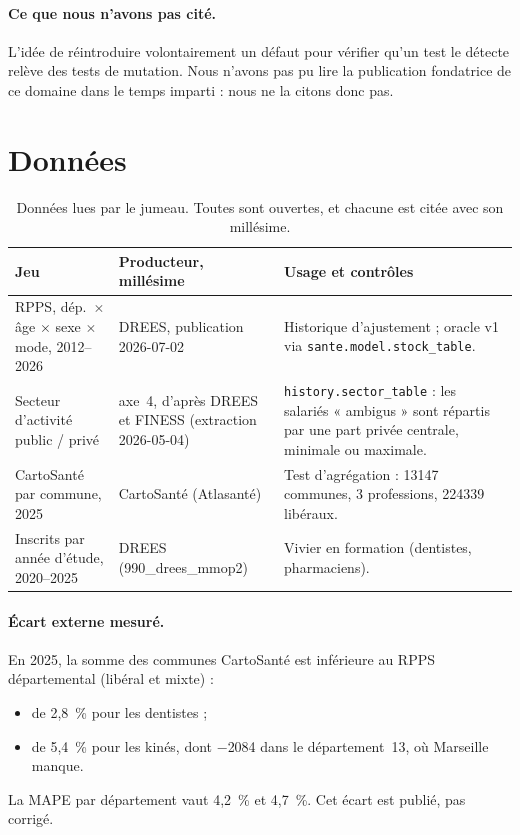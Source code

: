 \paragraph{Ce que nous n'avons pas cité.} L'idée de réintroduire volontairement un défaut pour
vérifier qu'un test le détecte relève des tests de mutation. Nous n'avons pas pu lire la publication
fondatrice de ce domaine dans le temps imparti : nous ne la citons donc pas.

\section{Données}

\begin{table}[h]
\centering\small
\begin{tabular}{p{4.2cm}p{3.3cm}p{6.4cm}}
\toprule
Jeu & Producteur, millésime & Usage et contrôles \\
\midrule
RPPS, dép.\ $\times$ âge $\times$ sexe $\times$ mode, 2012--2026 & DREES, publication 2026-07-02 &
Historique d'ajustement ; oracle v1 via \texttt{sante.model.stock\_table}. \\
Secteur d'activité public / privé & axe~4, d'après DREES et FINESS (extraction 2026-05-04) &
\texttt{history.sector\_table} : les salariés « ambigus » sont répartis par une part privée
centrale, minimale ou maximale. \\
CartoSanté par commune, 2025 & CartoSanté (Atlasanté) &
Test d'agrégation : \num{13147}\mesure{} communes, 3 professions, \num{224339}\mesure{} libéraux. \\
Inscrits par année d'étude, 2020--2025 & DREES (990\_drees\_mmop2) &
Vivier en formation (dentistes, pharmaciens). \\
\bottomrule
\end{tabular}
\caption{Données lues par le jumeau. Toutes sont ouvertes, et chacune est citée avec son millésime.}
\end{table}

\paragraph{Écart externe mesuré.} En 2025, la somme des communes CartoSanté est inférieure au RPPS
départemental (libéral et mixte) :
\begin{itemize}
  \item de 2,8\mesure{}~\% pour les dentistes ;
  \item de 5,4\mesure{}~\% pour les kinés, dont $-$\num{2084}\mesure{} dans le département~13, où
        Marseille manque.
\end{itemize}
La MAPE par département vaut 4,2\mesure{}~\% et 4,7\mesure{}~\%. Cet écart est publié, pas corrigé.

